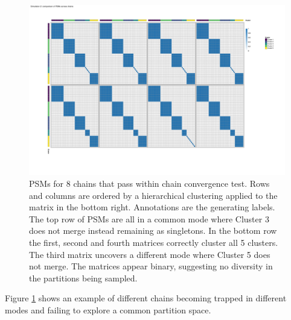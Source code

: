 \documentclass{bioinfo}
\begin{document}
\begin{figure} %
	\centering
	\includegraphics[scale=0.2]{./Images/Simulations/small_n_large_p_base/PSMs/BayesianSimulation2PSMs.png}
	\caption{PSMs for 8 chains that pass within chain convergence test. Rows and columns are ordered by a hierarchical clustering applied to the matrix in the bottom right. Annotations are the generating labels. The top row of PSMs are all in a common mode where Cluster 3 does not merge instead remaining as singletons. In the bottom row the first, second and fourth matrices correctly cluster all 5 clusters. The third matrix uncovers a different mode where Cluster 5 does not merge. The matrices appear binary, suggesting no diversity in the partitions being sampled.}
	\label{fig:simSmallNLargePPSMs}
\end{figure}
Figure \ref{fig:simSmallNLargePPSMs} shows an example of different chains becoming trapped in different modes and failing to explore a common partition space. 


\end{document}
